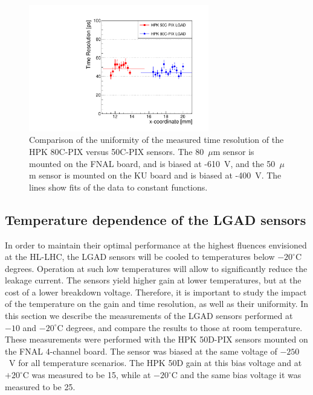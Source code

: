 \documentclass[preprint,1p]{elsarticle}
\begin{document}

\begin{figure}[htbp] 
\centering
\includegraphics[width=0.7\textwidth]{figs/FNAL_TimeResolution_vs_X_HPK50CVs80C_WithFits.pdf} 
\caption{Comparison of the uniformity of the measured time resolution of the HPK 80C-PIX versus 50C-PIX sensors. The 80~$\mu$m sensor is mounted on the FNAL board, and is biased at -610~V, and the 50~$\mu$m sensor is mounted on the KU board and is biased at -400~V. The lines show fits of the data to constant functions.} 
\label{fig:HPK50CVs80C} 
\end{figure} 

\subsection{Temperature dependence of the LGAD sensors}
\label{sec:temp_dependance}

In order to maintain their optimal performance at the highest fluences
envisioned at the HL-LHC, the LGAD sensors will be cooled to temperatures below
$-20^{\circ}$C degrees. Operation at such low temperatures will allow to
significantly reduce the leakage current. The sensors yield higher gain at lower 
temperatures, but at the cost of a lower breakdown voltage. Therefore, it is 
important to study the impact of the temperature on the gain and time 
resolution, as well as their uniformity. In this section we describe the measurements of
the LGAD sensors performed at $-10$ and $-20^{\circ}$C degrees, and compare the
results to those at room temperature. These measurements were performed with the
HPK 50D-PIX sensors mounted on the FNAL 4-channel board. The sensor was biased
at the same voltage of $-250$~V for all temperature scenarios. The HPK 50D gain
at this bias voltage and at $+20^{\circ}$C was measured to be 15, while at
$-20^{\circ}$C and the same bias voltage it was measured to be 25.
\end{document}
